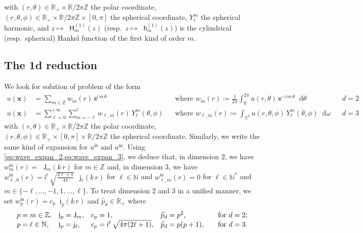 \documentclass[12pt,a4paper]{article}
\theoremstyle{definition}
\theoremstyle{plain}
\theoremstyle{remark}
\newcommand{\bbN}{\mathbb{N}}
\newcommand{\bbR}{\mathbb{R}}
\newcommand{\bbS}{\mathbb{S}}
\newcommand{\bbZ}{\mathbb{Z}}
\newcommand{\ex}{\mathsf{e}}
\newcommand{\im}{\mathsf{i}}
\newcommand{\bJ}{\mathop{}\!\mathsf{J}}
\newcommand{\Hu}{\mathop{}\!\mathsf{H}^{(1)}}
\newcommand{\bj}{\mathop{}\!\mathsf{j}}
\newcommand{\hu}{\mathop{}\!\mathsf{h}^{(1)}}
\newcommand{\frj}{\mathop{}\!\mathfrak{j}}
\newcommand{\di}[1]{\mathop{}\!\mathrm{d}#1}
\newcommand{\vx}{\boldsymbol{x}}
\newcommand{\inc}{\mathsf{in}}
\newcommand{\sca}{\mathsf{sc}}
\begin{document}
with \((r, \theta) \in \bbR_+ \times \bbR / 2\pi\bbZ\) the polar coordinate,
\((r, \theta, \phi) \in \bbR_+ \times \bbR / 2\pi\bbZ \times [0, \pi]\) the spherical coordinate, \(Y_\ell^m\) the spherical harmonic, and \(z \mapsto \Hu_m(z)\) (resp.\ \(z \mapsto \hu_m(z)\)) is the cylindrical (resp.\ spherical) Hankel function of the first kind of order \(m\).

\subsection{The 1d reduction}

We look for solution of problem of the form
\begin{align*}
    u(\vx)
     & = \sum_{m \in \bbZ} w_m(r)\, \ex^{\im\, m\, \theta}
     &                                                                                           & \text{where } w_m(r) \coloneqq \frac{1}{2\pi} \int_0^{2\pi} u(r,\theta)\, \ex^{-\im\, m\, \theta} \di{\theta}
     &                                                                                           & d = 2                                                                                                                   \\
    u(\vx)
     & = \sum_{\ell = 0}^{+\infty} \sum_{m = -\ell}^\ell w_{\ell, m}(r)\, Y_\ell^m(\theta, \phi)
     &                                                                                           & \text{where } w_{\ell, m}(r) \coloneqq \int_{\bbS^2} u(r, \theta, \phi)\, \overline{Y_\ell^m(\theta, \phi)} \di{\omega}
     &                                                                                           & d = 3
\end{align*}
with \((r, \theta) \in \bbR_+ \times \bbR / 2\pi\bbZ\) the polar coordinate,
\((r, \theta, \phi) \in \bbR_+ \times [0, \pi] \times \bbR / 2\pi\bbZ\) the spherical coordinate.
Similarly, we write the same kind of expansion for \(u^\inc\) and \(u^\sca\).
Using \cref{eq:wave_expan_2,eq:wave_expan_3}, we deduce that, in dimension \(2\), we have \(w_m^\inc(r) = \bJ_m(k\, r)\) for \(m \in \bbZ\) and, in dimension \(3\), we have \(w_{\ell, 0}^\inc(r) = \im^\ell\, \sqrt{\frac{2\ell+1}{4\pi}}\, \bj_\ell(k\, r)\) for \(\ell \in \bbN\) and \(w_{\ell, m}^\inc(r) = 0\) for \(\ell \in \bbN^*\) and \(m \in \{-\ell, \ldots, -1, 1, \ldots, \ell\}\).
To treat dimension \(2\) and \(3\) in a unified manner, we set \(w_p^\inc(r) = c_p\frj_p(k\, r)\) and \(\widehat{p}_d \in \bbR_+\) where
\[
    \begin{array}{l@{\quad}l@{\quad}l@{\quad}l@{\qquad}l}
        p = m \in \bbZ,    & \frj_p = \bJ_m,    & c_p = 1,                                & \widehat{p}_d = p^2,    & \text{for } d = 2; \\
        p = \ell \in \bbN, & \frj_p = \bj_\ell, & c_p = \im^\ell\, \sqrt{4\pi (2\ell+1)}, & \widehat{p}_d = p(p+1), & \text{for } d = 3.
    \end{array}
\]
\end{document}
